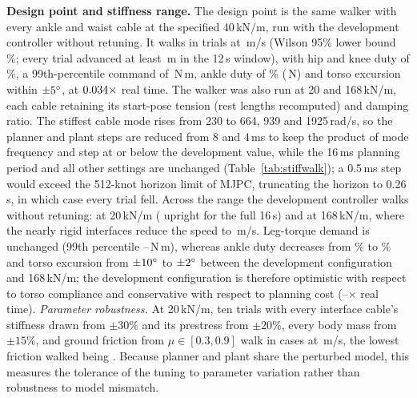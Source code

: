 \documentclass[letterpaper, 10pt, conference]{ieeeconf}
\begin{document}
\textbf{Design point and stiffness range.} The design point is the same
walker with every ankle and waist cable at the specified 40\,kN/m, run
with the development controller without retuning. It walks in \headRate{}
trials at \headV\,m/s (Wilson 95\% lower bound \headCiLo\%; every trial
advanced at least \headDistMin\,m in the 12\,s window), with hip and knee
duty of \headLegDuty\%, a 99th-percentile command of
\headLegNmPeak\,N\,m, ankle duty of \headAnkleDuty\% (\headAnklePeak\,N)
and torso excursion within $\pm5^\circ$, at $0.034\times$
real time. The walker was also run at 20 and 168\,kN/m, each cable retaining its
start-pose tension (rest lengths recomputed) and damping ratio. The
stiffest cable mode rises from 230 to 664, 939 and 1925\,rad/s, so the
planner and plant steps are reduced from 8 and 4\,ms to keep the product
of mode frequency and step at or below the development value, while the
16\,ms planning period and all other settings are unchanged
(Table~\ref{tab:stiffwalk}); a 0.5\,ms step would exceed the 512-knot
horizon limit of MJPC, truncating the horizon to 0.26\,s, in which case
every trial fell. Across the range the development controller walks
without retuning: \walkerKTwentyRate{} at 20\,kN/m
(\walkerKTwentyUpright{} upright for the full 16\,s) and
\walkerKStiffRate{} at 168\,kN/m, where the nearly rigid interfaces
reduce the speed to \walkerKStiffV\,m/s. Leg-torque demand is unchanged
(99th percentile \walkerKFortyLegPnn--\walkerKTwentyLegPnn\,N\,m), whereas
ankle duty decreases from \hybridAnkleDuty\% to \walkerKStiffAnkleDuty\%
and torso excursion from $\pm10^\circ$ to
$\pm2^\circ$ between the development configuration
and 168\,kN/m; the development configuration is therefore optimistic with respect to
torso compliance and conservative with respect to planning cost
(\walkerKTwentyRt--\walkerKStiffRt$\times$ real time). \emph{Parameter robustness.} At 20\,kN/m, ten trials with every
interface cable's stiffness drawn from $\pm30\%$ and its prestress from
$\pm20\%$, every body mass from $\pm15\%$, and ground friction from
$\mu\in[0.3,0.9]$ walk in \randRate{} cases at \randV\,m/s, the lowest
friction walked being \randMuMin. Because planner and plant share the
perturbed model, this measures the tolerance of the tuning to parameter
variation rather than robustness to model mismatch.
\end{document}
